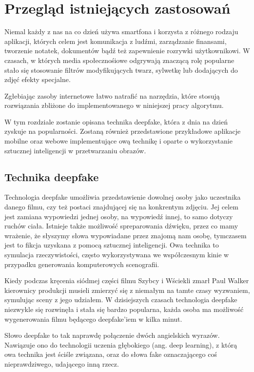 \chapter{Przegląd istniejących zastosowań}

Niemal każdy z nas na co dzień używa smartfona i korzysta z różnego rodzaju aplikacji, których celem jest komunikacja z ludźmi, zarządzanie finansami, tworzenie notatek, dokumentów bądź też zapewnienie rozrywki użytkownikowi. W czasach, w których media społecznośiowe odgrywają znaczącą rolę popularne stało się stosowanie filtrów modyfikujących twarz, sylwetkę lub dodających do zdjęć efekty specjalne. 

Zgłebiając zasoby internetowe łatwo natrafić na narzędzia, które stosują rozwiązania zbliżone do implementowanego w niniejszej pracy algorytmu.

W tym rozdziale zostanie opisana technika deepfake, która z dnia na dzień zyskuje na popularności. Zostaną również przedstawione przykładowe aplikacje mobilne oraz webowe implementujące ową technikę i oparte o wykorzystanie sztucznej inteligencji w przetwarzaniu obrazów. 


\section{Technika deepfake}
Technologia deepfake umożliwia przedstawienie dowolnej osoby jako uczestnika danego filmu, czy też postaci znajdującej się na konkrentym zdjęciu. Jej celem jest zamiana wypowiedzi jednej osoby, na wypowiedź innej, to samo dotyczy ruchów ciała. Istnieje także możliwość spreparowania dźwięku, przez co mamy wrażenie, że słyszymy słowa wypowiadane przez znajomą nam osobę, tymczasem jest to fikcja uzyskana z pomocą sztucznej inteligencji. Owa technika to symulacja rzeczywistości, często wykorzystywana we współczesnym kinie w przypadku generowania komputerowych scenografii.

Kiedy podczas kręcenia siódmej części filmu Szybcy i Wściekli zmarł Paul Walker kierownicy produkcji musieli zmierzyć się z niemałym na tamte czasy wyzwaniem, symulując sceny z jego udziałem. W dzisiejszych czasach technologia deepfake niezwykle się rozwinęła i stała się bardzo popularna, każda osoba ma możliwość wygenerowania filmu będącego deepfake'iem w kilka minut.

Słowo deepfake to tak naprawdę połączenie dwóch angielskich wyrazów. Nawiązuje ono do technologii uczenia głębokiego (ang. deep learning), z którą owa technika jest ściśle związana, oraz do słowa fake oznaczającego coś nieprawdziwego, udającego inną rzecz.

